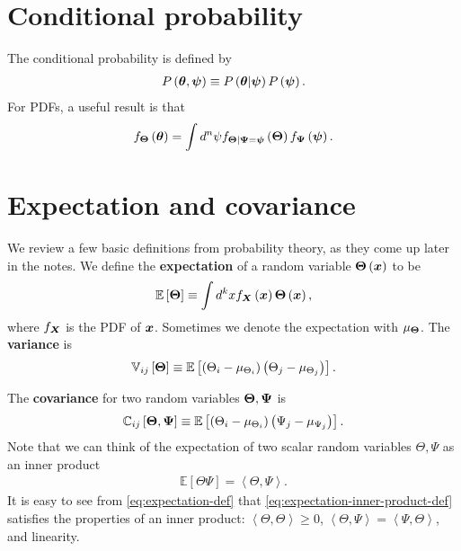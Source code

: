 \section{Conditional probability}

The conditional probability is defined by
\begin{align}
    P\left({\bm \theta},{\bm \psi}\right)
    \equiv
    P\left({\bm \theta}|{\bm \psi}\right)
    P\left({\bm \psi}\right)
    .
\end{align}
For PDFs, a useful result is that
\begin{align}
    f_{{\bm \Theta}}\left({\bm \theta}\right)
    =
    \int d^n\psi f_{{\bm \Theta}|{\bm \Psi}={\bm \psi}}\left({\bm \Theta}\right)f_{{\bm \Psi}}\left({\bm \psi}\right)
    .
\end{align}

\section{Expectation and covariance}

We review a few basic definitions from probability theory, as they come
up later in the notes.
We define the \textbf{expectation} of a random variable ${\bm \Theta}\left({\bm x}\right)$ to be
\begin{align}
    \label{eq:expectation-def}
    \mathbb{E}\left[{\bm \Theta}\right]
    \equiv
    \int d^kx f_{{\bm X}}\left({\bm x}\right) {\bm \Theta}\left({\bm x}\right)
    ,
\end{align}
where $f_{{\bm X}}$ is the PDF of ${\bm x}$.
Sometimes we denote the expectation with $\mu_{{\bm \Theta}}$.
The \textbf{variance} is
\begin{align}
    \label{eq:variance-def}
    \mathbb{V}_{ij}\left[{\bm \Theta}\right]
    \equiv
    \mathbb{E}\left[
        \left(\Theta_i-\mu_{\Theta_i}\right)
        \left(\Theta_j-\mu_{\Theta_j}\right)
    \right]
    .
\end{align}

The \textbf{covariance} for two random variables ${\bm \Theta},{\bm \Psi}$ is
\begin{align}
    \label{eq:covariance-def}
    \mathbb{C}_{ij}\left[{\bm \Theta},{\bm \Psi}\right]
    \equiv
    \mathbb{E}\left[
        \left(\Theta_i - \mu_{\Theta_i}\right)
        \left(\Psi_j   - \mu_{\Psi_j}  \right)
    \right]
    .
\end{align}
Note that we can think of the expectation of two scalar random variables $\Theta,\Psi$ as an inner product
\begin{align}
    \label{eq:expectation-inner-product-def}
    \mathbb{E}\left[\Theta\Psi\right]
    =
    \left<\Theta,\Psi\right>
    .
\end{align}
It is easy to see from \eqref{eq:expectation-def} that \eqref{eq:expectation-inner-product-def} satisfies
the properties of an inner product: 
$\left<\Theta,\Theta\right>\geq0$, $\left<\Theta,\Psi\right>=\left<\Psi,\Theta\right>$, and linearity.

